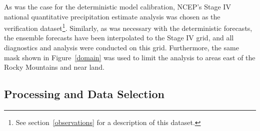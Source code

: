 As was the case for the deterministic model calibration, NCEP's Stage IV national quantitative precipitation estimate analysis was chosen as the verification dataset\footnote{See \mbox{section \ref{observations}} for a description of this dataset.}.
Similarly, as was necessary with the deterministic forecasts, the ensemble forecasts have been interpolated to the Stage IV grid, and all diagnostics and analysis were conducted on this grid.
Furthermore, the same mask shown in \mbox{Figure \ref{domain}} was used to limit the analysis to areas east of the Rocky Mountains and near land.




\subsection{Processing and Data Selection}
\label{eprocessing}


